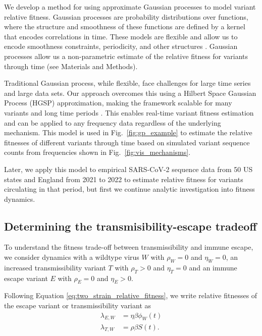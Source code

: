 \documentclass[11pt,oneside,letterpaper]{article}
\newcommand{\wt}{W}
\newcommand{\varE}{E}
\newcommand{\varT}{T}
\newcommand{\varEscape}{\eta}
\newcommand{\varTransmission}{\rho}
\begin{document}
We develop a method for using approximate Gaussian processes to model variant relative fitness.
Gaussian processes are probability distributions over functions, where the structure and smoothness of these functions are defined by a kernel that encodes correlations in time.
These models are flexible and allow us to encode smoothness constraints, periodicity, and other structures \cite{Gortler2019a}.
Gaussian processes allow us a non-parametric estimate of the relative fitness for variants through time (see Materials and Methods).

Traditional Gaussian process, while flexible, face challenges for large time series and large data sets.
Our approach overcomes this using a Hilbert Space Gaussian Process (HGSP) approximation, making the framework scalable for many variants and long time periods \cite{riutortmayol2022practical}.
This enables real-time variant fitness estimation and can be applied to any frequency data regardless of the underlying mechanism.
This model is used in Fig.~\ref{fig:gp_example} to estimate the relative fitnesses of different variants through time based on simulated variant sequence counts from frequencies shown in Fig.~\ref{fig:vis_mechanisms}.

Later, we apply this model to empirical SARS-CoV-2 sequence data from 50 US states and England from 2021 to 2022 to estimate relative fitness for variants circulating in that period, but first we continue analytic investigation into fitness dynamics.

\subsection*{Determining the transmisibility-escape tradeoff}

To understand the fitness trade-off between transmissibility and immune escape, we consider dynamics with a wildtype virus $\wt$ with $\varTransmission_\wt = 0$ and $\varEscape_\wt = 0$, an increased transmissibility variant $\varT$ with $\varTransmission_\varT > 0$ and $\varEscape_\varT = 0$ and an immune escape variant $\varE$ with $\varTransmission_\varE = 0$ and $\varEscape_\varE > 0$.

Following Equation \ref{eq:two_strain_relative_fitness}, we write relative fitnesses of the escape variant or transmissibility variant as
\begin{align*}
    \lambda_{\varE, \wt} &= \varEscape \beta \phi_{\wt}(t)\\
    \lambda_{\varT, \wt} &= \varTransmission \beta S(t).
\end{align*}
\end{document}
